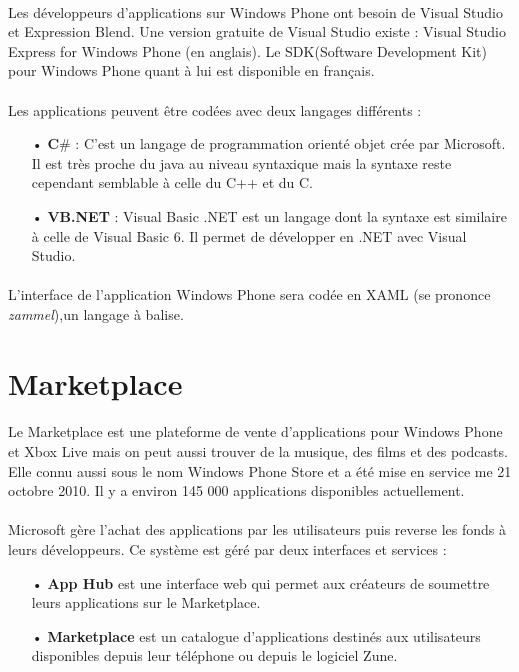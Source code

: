 \documentclass[twoside,UTF8]{EPURapport}
\begin{document}
\paragraph{}
Les développeurs d'applications sur Windows Phone ont besoin de Visual Studio et Expression Blend. Une version gratuite de Visual Studio existe : Visual Studio Express for Windows Phone (en anglais). Le SDK(Software Development Kit) pour Windows Phone quant à lui est disponible en français. 

\paragraph{}
Les applications peuvent être codées avec deux langages différents : 
\begin{itemize}
	\item[•]\textbf{C$\#$} : C'est un langage de programmation orienté objet crée par Microsoft. Il est très proche du java au niveau syntaxique mais la syntaxe reste cependant semblable à celle du C++ et du C. 
	\item[•]\textbf{VB.NET} : Visual Basic .NET est un langage dont la syntaxe est similaire à celle de Visual Basic 6. Il permet de développer en .NET avec Visual Studio.
\end{itemize}

\paragraph{}
L'interface de l'application Windows Phone sera codée en XAML (se prononce \textit{zammel}),un langage à balise.  

\section{Marketplace}

\paragraph{}
Le Marketplace est une plateforme de vente d'applications pour Windows Phone et Xbox Live mais on peut aussi trouver de la musique, des films et des podcasts. Elle connu aussi sous le nom Windows Phone Store et a été mise en service me 21 octobre 2010. Il y a environ 145 000 applications disponibles actuellement.

\paragraph{}
Microsoft gère l'achat des applications par les utilisateurs puis reverse les fonds à leurs développeurs. Ce système est géré par deux interfaces et services : 
\begin{itemize}
	\item[•] \textbf{App Hub} est une interface web qui permet aux créateurs de soumettre leurs applications sur le Marketplace.
	\item[•]\textbf{Marketplace} est un catalogue d'applications destinés aux utilisateurs disponibles depuis leur téléphone ou depuis le logiciel Zune.
\end{itemize}
\end{document}
